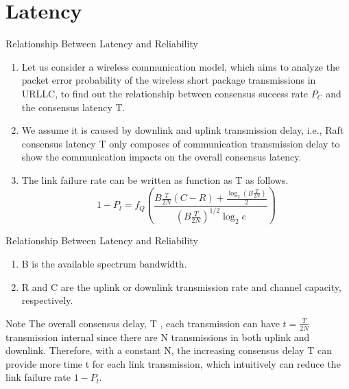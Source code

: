 \documentclass{beamer}
\begin{document}
\section{Latency}
\begin{frame}{Relationship Between Latency and Reliability}
 \begin{block}{}
 \begin{enumerate}
     \item 
     Let us consider a wireless communication model, which aims to analyze the packet error probability of the wireless short package transmissions in URLLC, to find out the relationship between consensus success rate $P_C$ and the consensus latency T.
     \item 
     We assume it is caused by downlink and uplink transmission delay, i.e., Raft consensus latency T only composes of communication transmission delay to show the communication impacts on the overall consensus latency.
     \item
     The link failure rate can be written as function as T as follows.
     \begin{equation}
         1-P_l =f_{Q}\left(\frac{B\frac{T}{2N}(C-R)+\frac{\log_{2}(B\frac{T}{2N})}{2}}{(B\frac{T}{2N})^{1/2}\log_{2}e}\right) 
     \end{equation}
 \end{enumerate}
 
\end{block}
     
\end{frame}
\begin{frame}{Relationship Between Latency and Reliability}
 \begin{enumerate}
     \item 
     B is the available spectrum bandwidth.
     \item
     R and C are the uplink or downlink transmission rate and channel capacity, respectively.
 \end{enumerate}
 \begin{block}{Note}
The overall consensus delay, T , each transmission can have
$t =\frac{T}{2N}$ transmission internal since there are N transmissions in both uplink and downlink. Therefore, with a constant N, the increasing consensus delay T can provide more time t for each link transmission, which intuitively can reduce the link failure rate $1 - P_{l}$.

\end{block} 
 \end{frame}
\end{document}
